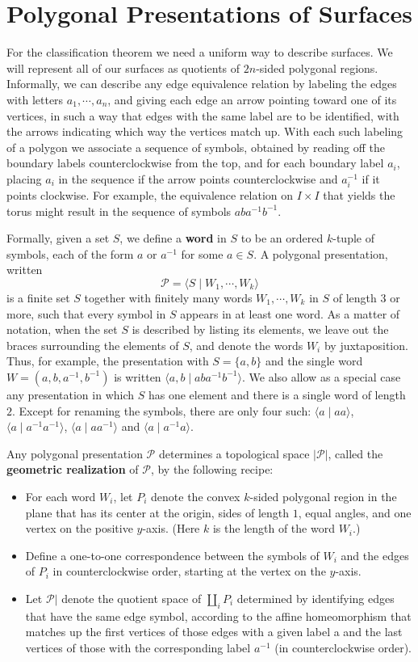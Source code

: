 \section{Polygonal Presentations of Surfaces}
For the classification theorem we need a uniform way to describe surfaces. We will represent all of our surfaces as quotients of $2n$-sided polygonal regions. Informally, we can describe any edge equivalence relation by labeling the edges with letters $a_1,\cdots,a_n$, and giving each edge an arrow pointing toward one of its vertices, in such a way that edges with the same label are to be identified, with the arrows indicating which way the vertices match up. With
each such labeling of a polygon we associate a sequence of symbols, obtained by
reading off the boundary labels counterclockwise from the top, and for each boundary label $a_i$, placing $a_i$ in the sequence if the arrow points counterclockwise and $a^{-1}_i$ if it points clockwise. For example, the equivalence relation on $I\times I$ that yields the torus might result in the sequence of symbols $aba^{-1}b^{-1}$.\par
Formally, given a set $S$, we define a \textbf{word} in $S$ to be an ordered $k$-tuple of symbols, each of the form $a$ or $a^{-1}$ for some $a\in S$. A polygonal presentation, written
\[\mathcal{P}=\langle S\mid W_1,\cdots,W_k\rangle\]
is a finite set $S$ together with finitely many words $W_1,\cdots,W_k$ in $S$ of length $3$ or more, such that every symbol in $S$ appears in at least one word. As a matter of notation, when the set $S$ is described by listing its elements, we leave out the braces surrounding the elements of $S$, and denote the words $W_i$ by juxtaposition. Thus, for example, the presentation with $S=\{a,b\}$ and the single word $W=(a,b,a^{-1},b^{-1})$ is written $\langle a,b\mid aba^{-1}b^{-1}\rangle$. We also allow as a special case any presentation in which $S$ has one element and there is a single word of length $2$. Except for renaming
the symbols, there are only four such: $\langle a\mid aa\rangle$, $\langle a\mid a^{-1}a^{-1}\rangle$, $\langle a\mid aa^{-1}\rangle$ and $\langle a\mid a^{-1}a\rangle$.\par
Any polygonal presentation $\mathcal{P}$ determines a topological space $|\mathcal{P}|$, called the \textbf{geometric realization} of $\mathcal{P}$, by the following recipe:
\begin{itemize}
\item For each word $W_i$, let $P_i$ denote the convex $k$-sided polygonal region in the plane that has its center at the origin, sides of length $1$, equal angles, and one vertex on the positive $y$-axis. (Here $k$ is the length of the word $W_i$.)
\item Define a one-to-one correspondence between the symbols of $W_i$ and the edges
of $P_i$ in counterclockwise order, starting at the vertex on the $y$-axis.
\item Let $\mathcal{P}|$ denote the quotient space of $\coprod_iP_i$ determined by identifying edges that have the same edge symbol, according to the affine homeomorphism that matches up the first vertices of those edges with a given label a and the last vertices of those with the corresponding label $a^{-1}$ (in counterclockwise order).
\end{itemize}
